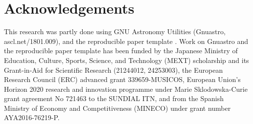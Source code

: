 \documentclass[10pt, twocolumn]{article}
\begin{document}
\section{Acknowledgements}

This research was partly done using GNU Astronomy Utilities (Gnuastro,
ascl.net/1801.009), and the reproducible paper template
\pipelineversion. Work on Gnuastro and the reproducible paper template has
been funded by the Japanese Ministry of Education, Culture, Sports,
Science, and Technology (MEXT) scholarship and its Grant-in-Aid for
Scientific Research (21244012, 24253003), the European Research Council
(ERC) advanced grant 339659-MUSICOS, European Union’s Horizon 2020 research
and innovation programme under Marie Sklodowska-Curie grant agreement No
721463 to the SUNDIAL ITN, and from the Spanish Ministry of Economy and
Competitiveness (MINECO) under grant number AYA2016-76219-P.



\printbibliography

\end{document}
